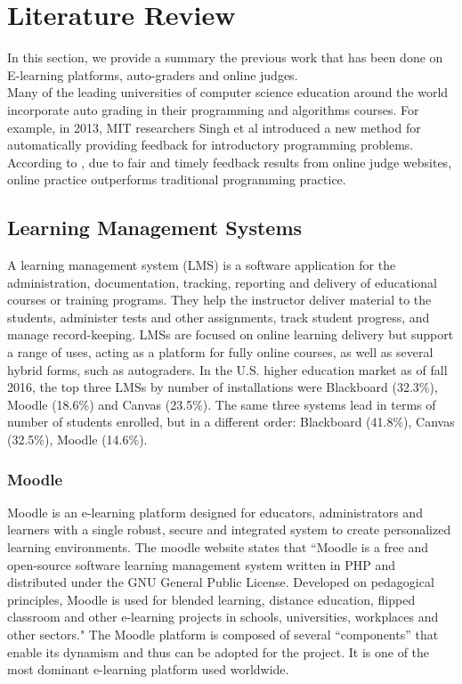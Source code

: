 \documentclass[12pt]{article}
\begin{document}
\newpage

\section{Literature Review}
	In this section, we provide a summary the previous work that has been done on E-learning platforms, auto-graders and online judges.\\
	
	\noindent Many of the leading universities of computer science education around the world incorporate auto grading in their 			programming and algorithms courses. For example, in 2013, MIT researchers Singh et al \cite{singh} introduced a new method for automatically providing feedback for introductory programming problems. According to \cite{ojpot}, due to fair and timely feedback results from online judge websites, online practice outperforms traditional programming practice.
	
	\subsection{Learning Management Systems}
	A learning management system (LMS) is a software application for the administration, documentation, tracking, reporting and delivery of educational courses or training programs.\cite{lms} They help the instructor deliver material to the students, administer tests and other assignments, track student progress, and manage record-keeping. LMSs are focused on online learning delivery but support a range of uses, acting as a platform for fully online courses, as well as several hybrid forms, such as autograders. In the U.S. higher education market as of fall 2016, the top three LMSs by number of installations were Blackboard (32.3\%), Moodle (18.6\%) and Canvas (23.5\%)\cite{lmsstats}.  The same three systems lead in terms of number of students enrolled, but in a different order: Blackboard (41.8\%), Canvas (32.5\%), Moodle (14.6\%).
		\subsubsection{Moodle}
		Moodle is an e-learning platform designed for educators, administrators and learners with a single robust, secure and integrated system to create personalized learning environments. \cite{moodle} The moodle website \cite{moodle} states that ``Moodle is a free and open-source software 	learning management system written in PHP and distributed under the GNU General Public License. Developed on pedagogical principles, Moodle is used for blended learning, distance education, flipped classroom and other e-learning projects in schools, universities, workplaces and other sectors." The Moodle platform is composed of several “components” that enable its dynamism and thus can be adopted for the project. It is one of the most dominant e-learning platform used worldwide.
\end{document}

